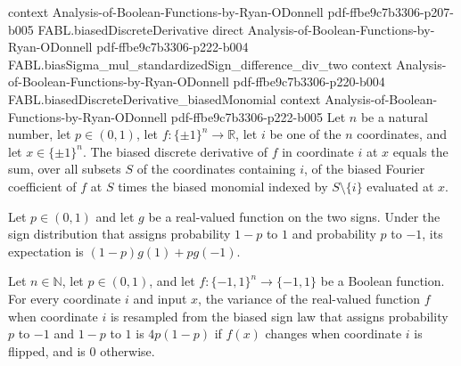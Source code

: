 \begin{theorem}
  {context}
  {Analysis-of-Boolean-Functions-by-Ryan-ODonnell}
  {pdf-ffbe9c7b3306-p207-b005}
\proofstep
  {FABL.biasedDiscreteDerivative}
  {direct}
  {Analysis-of-Boolean-Functions-by-Ryan-ODonnell}
  {pdf-ffbe9c7b3306-p222-b004}
\proofstep
  {FABL.biasSigma_mul_standardizedSign_difference_div_two}
  {context}
  {Analysis-of-Boolean-Functions-by-Ryan-ODonnell}
  {pdf-ffbe9c7b3306-p220-b004}
\proofstep
  {FABL.biasedDiscreteDerivative_biasedMonomial}
  {context}
  {Analysis-of-Boolean-Functions-by-Ryan-ODonnell}
  {pdf-ffbe9c7b3306-p222-b005}
Let $n$ be a natural number, let $p\in(0,1)$, let $f:\{\pm1\}^n\to\mathbb R$, let $i$ be
one of the $n$ coordinates, and let $x\in\{\pm1\}^n$. The biased discrete derivative of
$f$ in coordinate $i$ at $x$ equals the sum, over all subsets $S$ of the coordinates
containing $i$, of the biased Fourier coefficient of $f$ at $S$ times the biased
monomial indexed by $S\setminus\{i\}$ evaluated at $x$.
\end{theorem}

\begin{theorem}
\label{FABL.pmfExpectation_biasedSignPMF}
\leanok
{}
Let $p\in(0,1)$ and let $g$ be a real-valued function on the two signs. Under the sign
distribution that assigns probability $1-p$ to $1$ and probability $p$ to $-1$, its
expectation is $(1-p)g(1)+pg(-1)$.
\end{theorem}

\begin{theorem}
\label{FABL.coordinateConditionalVariance_biasedSignPMF_toReal}
\leanok
{}
Let $n\in\mathbb N$, let $p\in(0,1)$, and let $f:\{−1,1\}^n\to\{−1,1\}$ be a Boolean
function. For every coordinate $i$ and input $x$, the variance of the real-valued
function $f$ when coordinate $i$ is resampled from the biased sign law that assigns
probability $p$ to $-1$ and $1-p$ to $1$ is $4p(1-p)$ if $f(x)$ changes when coordinate
$i$ is flipped, and is $0$ otherwise.
\end{theorem}

